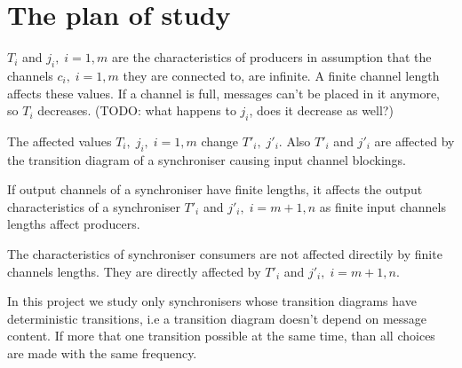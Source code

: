 \section{The plan of study}


$T_{i}$ and $j_{i}, \; i=1,m$ are the characteristics of producers in assumption that the channels $c_{i}, \; i=1,m$ they are connected to, are infinite. A finite channel length affects these values. If a channel is full, messages can't be placed in it anymore, so $T_{i}$ decreases. (TODO: what happens to $j_{i}$, does it decrease as well?)

The affected values $T_{i}, \; j_{i}, \; i=1,m$ change $T'_{i}, \; j'_{i}$. Also $T'_{i}$ and $j'_{i}$ are affected by the transition diagram of a synchroniser causing input channel blockings.

If output channels of a synchroniser have finite lengths, it affects the output characteristics of a synchroniser $T'_{i}$ and $j'_{i}, \; i=m+1,n$ as finite input channels lengths affect producers.

The characteristics of synchroniser consumers are not affected directily by finite channels lengths. They are directly affected by $T'_{i}$ and $j'_{i}, \; i=m+1,n$.


In this project we study only synchronisers whose transition diagrams have deterministic transitions, i.e a transition diagram doesn't depend on message content. If more that one transition possible at the same time, than all choices are made with the same frequency.



